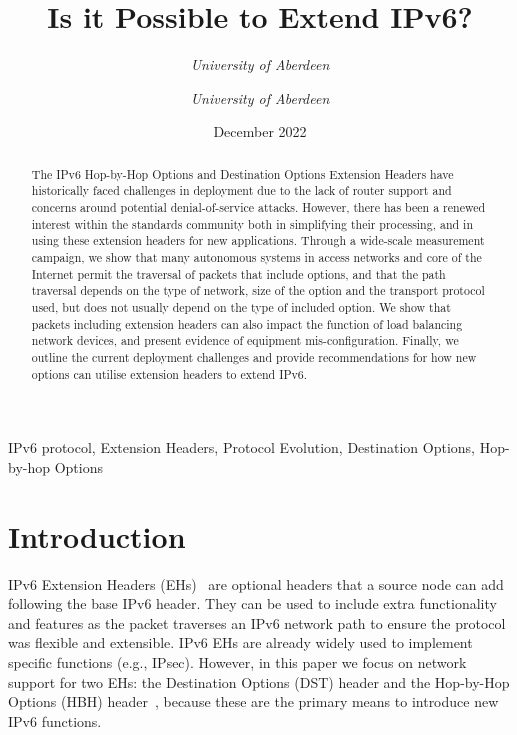 \documentclass[conference]{IEEEtran}
\title{Is it Possible to Extend IPv6?}
\date{December 2022}
\author{\IEEEauthorblockN{Ana Custura}
\IEEEauthorblockA{
\textit{University of Aberdeen}\\
}
\and
\IEEEauthorblockN{Raffaello Secchi}
\textit{University of Aberdeen}\\
\and
\IEEEauthorblockN{Gorry Fairhurst}
\textit{University of Aberdeen}\\
}
\begin{document}
\maketitle

\begin{abstract}
The IPv6 Hop-by-Hop Options and Destination Options Extension Headers have historically faced challenges in deployment due to the lack of router support  and concerns around potential denial-of-service attacks. However, there has been a renewed interest within the standards community both in simplifying their processing, and in using these extension headers for new applications. 
Through a wide-scale measurement campaign, we show that many autonomous systems in access networks and core of the Internet permit the traversal of packets that include options, and that the path traversal depends on the type of network, size of the option and the transport protocol used, but does not usually depend on the type of included option. We show that packets including extension headers can also impact the function of load balancing network devices, and present evidence of equipment mis-configuration. Finally, we outline the current deployment challenges and provide recommendations for how new options can utilise extension headers to extend IPv6.

\end{abstract}

\begin{IEEEkeywords}
IPv6 protocol, Extension Headers, Protocol Evolution, Destination Options, Hop-by-hop Options
\end{IEEEkeywords}

\section{Introduction}
\label{sec:introduction}

IPv6 Extension Headers (EHs)~\cite{RFC8200} are optional headers that a source node can
add following the base IPv6 header. They can be used to include extra functionality and features as the packet traverses an IPv6 network path 
to ensure the protocol was flexible and extensible.
IPv6 EHs are already widely used to implement specific functions (e.g., IPsec).
However, in this paper we focus on network support for two EHs: the Destination Options (DST) header and the Hop-by-Hop Options (HBH) header~\cite{rfc9098}, because these are the primary means to introduce new IPv6 functions.
\end{document}
